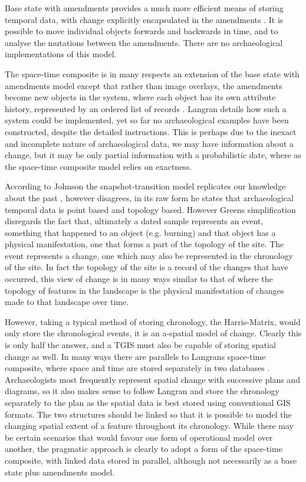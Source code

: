 Base state with amendments provides a much more efficient means of storing temporal data, with change explicitly encapsulated in the amendments \citep{Langran:1992uq}. It is possible to move individual objects forwards and backwards in time, and to analyse the mutations between the amendments. There are no archaeological implementations of this model.

The space-time composite is in many respects an extension of the base state with amendments model except that rather than image overlays, the amendments become new objects in the system, where each object has its own attribute history, represented by an ordered list of records \citep{Langran:1992uq}. Langran details how such a system could be implemented, yet so far no archaeological examples have been constructed, despite the detailed instructions. This is perhaps due to the inexact and incomplete nature of archaeological data, we may have information about a change, but it may be only partial information with a probabilistic date, where as the space-time composite model relies on exactness.

According to Johnson the snapshot-transition model replicates our knowledge about the past \citep{Johnson:1999cr}, however \citet{Green:2008fk} disagrees, in its raw form he states that archaeological temporal data is point based and topology based. However Greens simplification disregards the fact that, ultimately a dated sample represents an event, something that happened to an object (e.g. burning) and that object has a physical manifestation, one that forms a part of the topology of the site. The event represents a change, one which may also be represented in the chronology of the site. In fact the topology of the site is a record of the changes that have occurred, this view of change is in many ways similar to that of \citet{Ingold:1993zr} where the topology of features in the landscape is the physical manifestation of changes made to that landscape over time. 

However, taking a typical method of storing chronology, the Harris-Matrix, would only store the chronological events, it is an a-spatial model of change. Clearly this is only half the answer, and a TGIS must also be capable of storing spatial change as well. In many ways there are parallels to Langrans space-time composite, where space and time are stored separately in two databases \citep{Langran:1992uq}. Archaeologists most frequently represent spatial change with successive plans and diagrams, so it also makes sense to follow Langran and store the chronology separately to the plan as the spatial data is best stored using conventional GIS formats. The two structures should be linked so that it is possible to model the changing spatial extent of a feature throughout its chronology. While there may be certain scenarios that would favour one form of operational model over another, the pragmatic approach is clearly to adopt a form of the space-time composite, with linked data stored in parallel, although not necessarily as a base state plus amendments model.

